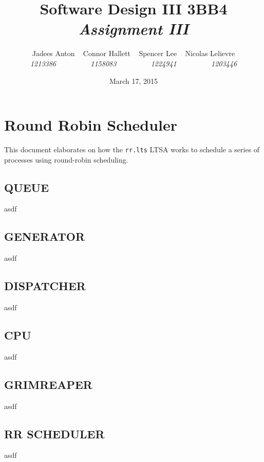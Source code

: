 \documentclass[]{article}
\title{\textbf{Software Design III 3BB4} \\ \textit{Assignment III}}
\date{March 17, 2015}
\author{Jadees Anton {\ } Connor Hallett {\ } Spencer Lee {\ } Nicolas Lelievre \\ \textit{1213386 {\ }{\ }{\ }{\ }{\ }{\ }{\ }{\ } 1158083 {\ }{\ }{\ }{\ }{\ }{\ }{\ }{\ } 1224941 {\ }{\ }{\ }{\ }{\ }{\ }{\ }{\ } 1203446}}
\begin{document}
\maketitle
\setlength{\pdfpagewidth}{8.5in}
\setlength{\pdfpageheight}{11in}

\section*{Round Robin Scheduler}
This document elaborates on how the \verb|rr.lts| LTSA works to schedule a series of processes using round-robin scheduling.
	
\subsection*{QUEUE}
asdf 

\subsection*{GENERATOR}
asdf 

\subsection*{DISPATCHER}
asdf

\subsection*{CPU}
asdf

\subsection*{GRIMREAPER}
asdf 

\subsection*{RR SCHEDULER}
asdf
\end{document}
